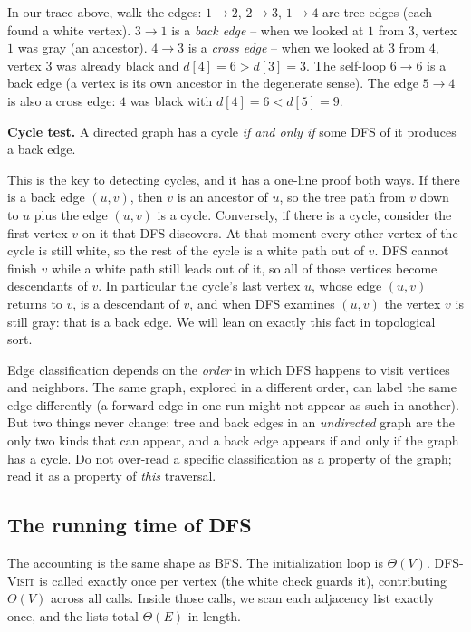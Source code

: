 In our trace above, walk the edges: $1\to2$, $2\to3$, $1\to4$ are tree edges
(each found a white vertex). $3\to1$ is a \emph{back edge} -- when we looked at
$1$ from $3$, vertex $1$ was gray (an ancestor). $4\to3$ is a \emph{cross edge}
-- when we looked at $3$ from $4$, vertex $3$ was already black and $d[4]=6 >
d[3]=3$. The self-loop $6\to6$ is a back edge (a vertex is its own ancestor in
the degenerate sense). The edge $5\to4$ is also a cross edge: $4$ was black with
$d[4]=6 < d[5]=9$.

\begin{formalbox}
\textbf{Cycle test.} A directed graph has a cycle \emph{if and only if} some DFS
of it produces a back edge.
\end{formalbox}

This is the key to detecting cycles, and it has a one-line proof both ways. If
there is a back edge $(u, v)$, then $v$ is an ancestor of $u$, so the tree path
from $v$ down to $u$ plus the edge $(u, v)$ is a cycle. Conversely, if there is a
cycle, consider the first vertex $v$ on it that DFS discovers. At that moment
every other vertex of the cycle is still white, so the rest of the cycle is a
white path out of $v$. DFS cannot finish $v$ while a white path still leads out
of it, so all of those vertices become descendants of $v$. In particular the cycle's last vertex $u$, whose edge
$(u, v)$ returns to $v$, is a descendant of $v$, and when DFS examines $(u,v)$ the
vertex $v$ is still gray: that is a back edge. We will lean on exactly this fact
in topological sort.

\begin{trapbox}
Edge classification depends on the \emph{order} in which DFS happens to visit
vertices and neighbors. The same graph, explored in a different order, can label
the same edge differently (a forward edge in one run might not appear as such in
another). But two things never change: tree and back edges in an \emph{undirected}
graph are the only two kinds that can appear, and a back edge appears if and only
if the graph has a cycle. Do not over-read a specific classification as a property
of the graph; read it as a property of \emph{this} traversal.
\end{trapbox}

\subsection{The running time of DFS}

The accounting is the same shape as BFS. The initialization loop is $\Theta(V)$.
\textsc{DFS-Visit} is called exactly once per vertex (the white check guards it),
contributing $\Theta(V)$ across all calls. Inside those calls, we scan each
adjacency list exactly once, and the lists total $\Theta(E)$ in length.

